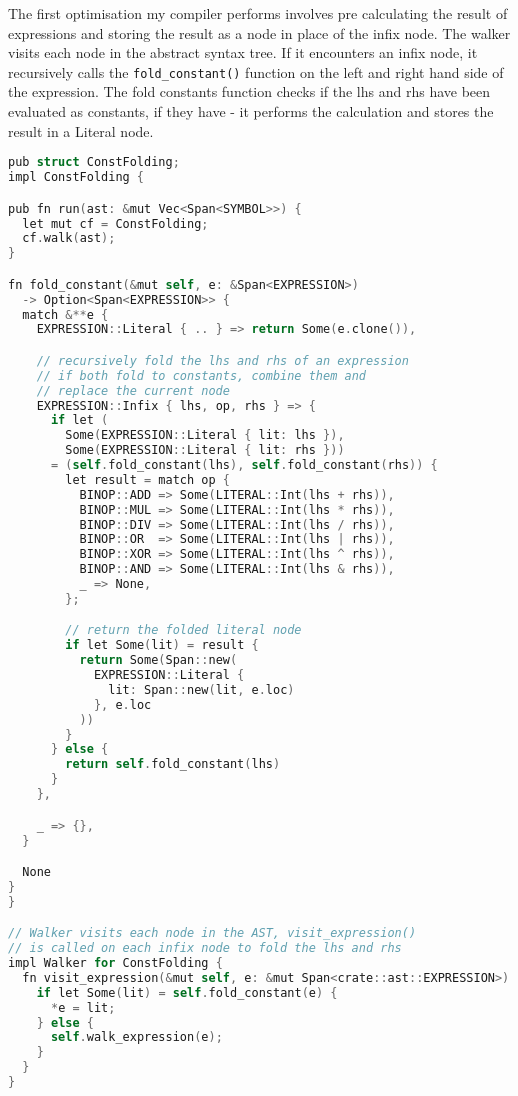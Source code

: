 The first optimisation my compiler performs involves pre calculating the result of expressions and storing the result as a node in place of the infix node. The walker visits each node in the abstract syntax tree. If it encounters an infix node, it recursively calls the \texttt{fold\_constant()} function on the left and right hand side of the expression. The fold constants function checks if the lhs and rhs have been evaluated as constants, if they have - it performs the calculation and stores the result in a Literal node. 

\begin{lstlisting}[language=C]
pub struct ConstFolding;
impl ConstFolding {

pub fn run(ast: &mut Vec<Span<SYMBOL>>) {
  let mut cf = ConstFolding;
  cf.walk(ast);
}

fn fold_constant(&mut self, e: &Span<EXPRESSION>) 
  -> Option<Span<EXPRESSION>> {
  match &**e {
    EXPRESSION::Literal { .. } => return Some(e.clone()),

    // recursively fold the lhs and rhs of an expression 
    // if both fold to constants, combine them and
    // replace the current node
    EXPRESSION::Infix { lhs, op, rhs } => {
      if let (
        Some(EXPRESSION::Literal { lit: lhs }), 
        Some(EXPRESSION::Literal { lit: rhs })) 
      = (self.fold_constant(lhs), self.fold_constant(rhs)) {
        let result = match op {
          BINOP::ADD => Some(LITERAL::Int(lhs + rhs)),
          BINOP::MUL => Some(LITERAL::Int(lhs * rhs)),
          BINOP::DIV => Some(LITERAL::Int(lhs / rhs)),
          BINOP::OR  => Some(LITERAL::Int(lhs | rhs)),
          BINOP::XOR => Some(LITERAL::Int(lhs ^ rhs)),
          BINOP::AND => Some(LITERAL::Int(lhs & rhs)),
          _ => None,
        };

        // return the folded literal node
        if let Some(lit) = result {
          return Some(Span::new(
            EXPRESSION::Literal { 
              lit: Span::new(lit, e.loc) 
            }, e.loc
          ))
        }
      } else {
        return self.fold_constant(lhs)
      }
    },

    _ => {},
  }

  None
} 
}

// Walker visits each node in the AST, visit_expression() 
// is called on each infix node to fold the lhs and rhs
impl Walker for ConstFolding {
  fn visit_expression(&mut self, e: &mut Span<crate::ast::EXPRESSION>) {
    if let Some(lit) = self.fold_constant(e) {
      *e = lit;
    } else {
      self.walk_expression(e);
    }
  }
}
\end{lstlisting}

